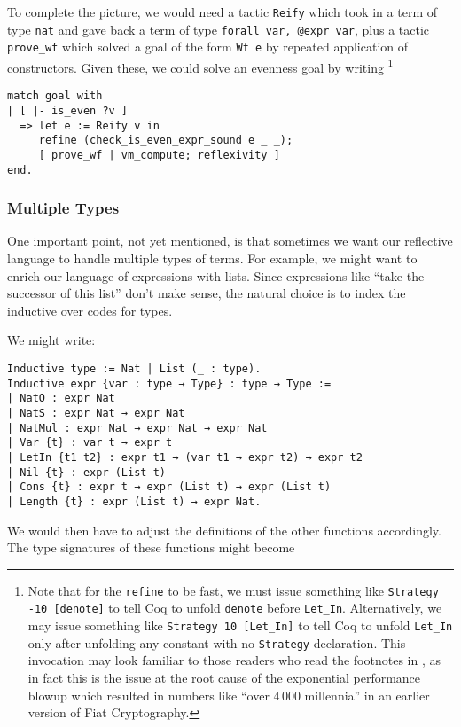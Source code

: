 To complete the picture, we would need a tactic \texttt{Reify} which took in a term of type \texttt{nat} and gave back a term of type \texttt{forall var, @expr var}, plus a tactic \texttt{prove_wf} which solved a goal of the form \texttt{Wf e} by repeated application of constructors.
Given these, we could solve an evenness goal by writing%
\footnote{%
  Note that for the \texttt{refine} to be fast, we must issue something like \texttt{Strategy -10 [denote]} to tell Coq to unfold \texttt{denote} before \texttt{Let_In}.
  Alternatively, we may issue something like \texttt{Strategy 10 [Let_In]} to tell Coq to unfold \texttt{Let_In} only after unfolding any constant with no \texttt{Strategy} declaration.
  This invocation may look familiar to those readers who read the footnotes in , as in fact this is the issue at the root cause of the exponential performance blowup which resulted in numbers like ``over 4\,000 millennia'' in an earlier version of Fiat Cryptography.
}
\begin{verbatim}
match goal with
| [ |- is_even ?v ]
  => let e := Reify v in
     refine (check_is_even_expr_sound e _ _);
     [ prove_wf | vm_compute; reflexivity ]
end.
\end{verbatim}

\subsubsection{Multiple Types} \label{sec:multiple-types-ASTs}
One important point, not yet mentioned, is that sometimes we want our reflective language to handle multiple types of terms.
For example, we might want to enrich our language of expressions with lists.
Since expressions like ``take the successor of this list'' don't make sense, the natural choice is to index the inductive over codes for types.

We might write:
\begin{verbatim}
Inductive type := Nat | List (_ : type).
Inductive expr {var : type → Type} : type → Type :=
| NatO : expr Nat
| NatS : expr Nat → expr Nat
| NatMul : expr Nat → expr Nat → expr Nat
| Var {t} : var t → expr t
| LetIn {t1 t2} : expr t1 → (var t1 → expr t2) → expr t2
| Nil {t} : expr (List t)
| Cons {t} : expr t → expr (List t) → expr (List t)
| Length {t} : expr (List t) → expr Nat.
\end{verbatim}
We would then have to adjust the definitions of the other functions accordingly.
The type signatures of these functions might become

